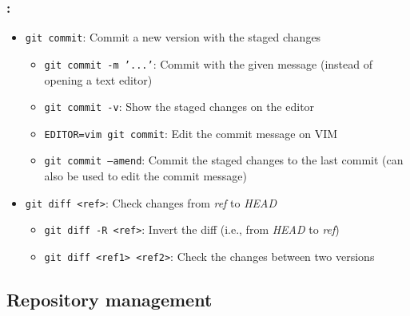 \begin{frame}
    \frametitle{\secname: \small\subsecname\normalsize}

    \begin{itemize}
        \item \texttt{git commit}: Commit a new version with the staged changes
        \begin{itemize}
            \item \texttt{git commit -m '...'}: Commit with the given message (instead of opening a text editor)
            \item \texttt{git commit -v}: Show the staged changes on the editor
            \item \texttt{EDITOR=vim git commit}: Edit the commit message on VIM
            \item \texttt{git commit --amend}: Commit the staged changes to the last commit (can also be used to edit the commit message)
        \end{itemize}
        \item \texttt{git diff <ref>}: Check changes from \textit{ref} to \textit{HEAD}
        \begin{itemize}
            \item \texttt{git diff -R <ref>}: Invert the diff (i.e., from \textit{HEAD} to \textit{ref})
            \item \texttt{git diff <ref1> <ref2>}: Check the changes between two versions
        \end{itemize}
    \end{itemize}
\end{frame}

\subsection{Repository management}

